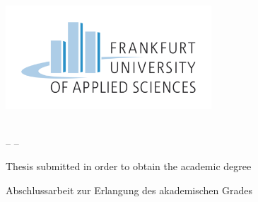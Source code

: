 \thispagestyle{empty}

\begin{titlepage}
	
	\vspace*{-3,5cm}
  	\begin{center}
    		\includegraphics[width=7.7cm]{Figures/pdf/FraUas_Logo.pdf} \\ 
  	\end{center}

  	\begin{center}
		\vspace{0.1cm}
		\LARGE \textbf{\University}\\
		\vspace{0.4cm}
		\Large -- \Faculty --
	\end{center}
	
	\vfill
	
	\begin{center}
		\huge \textbf{\ThesisTitle}
	\end{center}
	
	\vfill
	
	\ifdefined\ThesisLanguageIsEnglish
		\begin{center}
			\Large Thesis submitted in order to obtain the academic degree\\
			\vspace{0.3cm}
			\Large \ThesisDegree
		\end{center}
	\else
		\begin{center}
			\Large Abschlussarbeit zur Erlangung des akademischen Grades\\
			\vspace{0.3cm}
			\Large \ThesisDegree   %
		\end{center}
	\fi
	

\end{titlepage}
